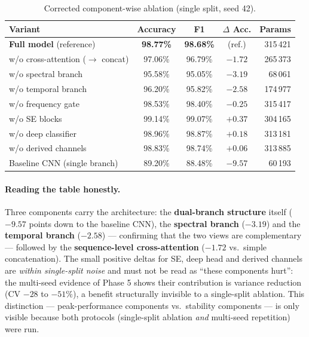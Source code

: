 \begin{table}[H]
\centering
\caption{Corrected component-wise ablation (single split, seed 42).}
\label{tab:ablation}
\renewcommand{\arraystretch}{1.25}
\small
\begin{tabular}{|l|c|c|c|r|}
\hline
\textbf{Variant} & \textbf{Accuracy} & \textbf{F1} & \textbf{$\Delta$ Acc.} & \textbf{Params} \\
\hline
\textbf{Full model} (reference) & \textbf{98.77\%} & \textbf{98.68\%} & (ref.) & 315\,421 \\
\hline
w/o cross-attention ($\to$ concat) & 97.06\% & 96.79\% & $\mathbf{-1.72}$ & 265\,373 \\
\hline
w/o spectral branch & 95.58\% & 95.05\% & $\mathbf{-3.19}$ & 68\,061 \\
\hline
w/o temporal branch & 96.20\% & 95.82\% & $\mathbf{-2.58}$ & 174\,977 \\
\hline
w/o frequency gate & 98.53\% & 98.40\% & $-0.25$ & 315\,417 \\
\hline
w/o SE blocks & 99.14\% & 99.07\% & $+0.37$ & 304\,165 \\
\hline
w/o deep classifier & 98.96\% & 98.87\% & $+0.18$ & 313\,181 \\
\hline
w/o derived channels & 98.83\% & 98.74\% & $+0.06$ & 313\,885 \\
\hline
Baseline CNN (single branch) & 89.20\% & 88.48\% & $\mathbf{-9.57}$ & 60\,193 \\
\hline
\end{tabular}
\end{table}

\paragraph{Reading the table honestly.} Three components carry the architecture: the \textbf{dual-branch structure} itself ($-9.57$ points down to the baseline CNN), the \textbf{spectral branch} ($-3.19$) and the \textbf{temporal branch} ($-2.58$) --- confirming that the two views are complementary --- followed by the \textbf{sequence-level cross-attention} ($-1.72$ vs.\ simple concatenation). The small positive deltas for SE, deep head and derived channels are \emph{within single-split noise} and must not be read as ``these components hurt'': the multi-seed evidence of Phase 5 shows their contribution is variance reduction (CV $-28$ to $-51\%$), a benefit structurally invisible to a single-split ablation. This distinction --- peak-performance components vs.\ stability components --- is only visible because both protocols (single-split ablation \emph{and} multi-seed repetition) were run.

